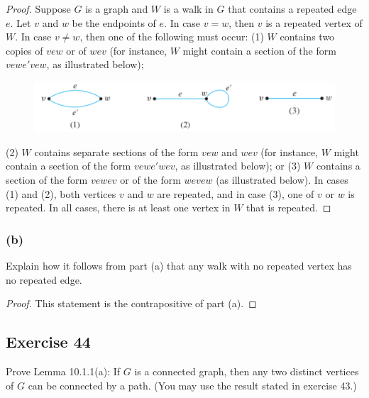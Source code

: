 \documentclass[14pt]{extarticle}
\begin{document}
\begin{proof}
Suppose \(G\) is a graph and \(W\) is a walk in \(G\) that contains a repeated edge \(e\). Let \(v\) and \(w\) be the 
endpoints of \(e\). In case \(v = w\), then \(v\) is a repeated vertex of \(W\). In case \(v \neq w\), then one of 
the following must occur: (1) \(W\) contains two copies of \(vew\) or of \(wev\) (for instance, \(W\) might contain a 
section of the form \(vewe'vew\), as illustrated below); 

\begin{figure}[ht!]
\centering
\includegraphics[scale=0.35]{../images/10.1.43.a.png}
\end{figure}

(2) \(W\) contains separate sections of the form \(vew\) and 
\(wev\) (for instance, \(W\) might contain a section of the form \(vewe'wev\), as illustrated below); or (3) \(W\) 
contains a section of the form \(vewev\) or of the form \(wevew\) (as illustrated below). In cases (1) and (2), both 
vertices \(v\) and \(w\) are repeated, and in case (3), one of \(v\) or \(w\) is repeated. In all cases, there is at least 
one vertex in \(W\) that is repeated.
\end{proof}

\subsubsection{(b)}
Explain how it follows from part (a) that any walk with no repeated vertex has no repeated edge.

\begin{proof}
This statement is the contrapositive of part (a).
\end{proof}

\subsection{Exercise 44}
Prove Lemma 10.1.1(a): If \(G\) is a connected graph, then any two distinct vertices of \(G\) can be connected by a path. 
(You may use the result stated in exercise 43.)
\end{document}
